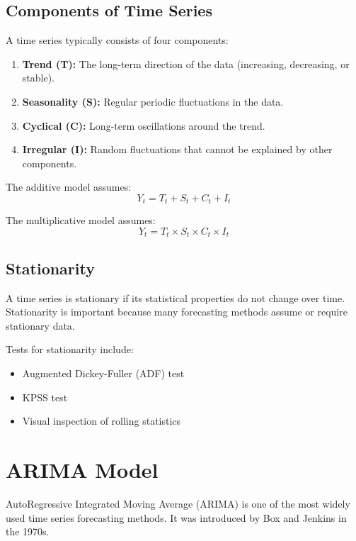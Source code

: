 \documentclass[12pt,a4paper]{report}
\begin{document}
\subsection{Components of Time Series}
\label{subsec:components}
A time series typically consists of four components:

\begin{enumerate}
    \item \textbf{Trend (T):} The long-term direction of the data (increasing, decreasing, or stable).
    \item \textbf{Seasonality (S):} Regular periodic fluctuations in the data.
    \item \textbf{Cyclical (C):} Long-term oscillations around the trend.
    \item \textbf{Irregular (I):} Random fluctuations that cannot be explained by other components.
\end{enumerate}

The additive model assumes:
\begin{equation}
Y_t = T_t + S_t + C_t + I_t
\end{equation}

The multiplicative model assumes:
\begin{equation}
Y_t = T_t \times S_t \times C_t \times I_t
\end{equation}

\subsection{Stationarity}
\label{subsec:stationarity}
A time series is stationary if its statistical properties do not change over time. Stationarity is important because many forecasting methods assume or require stationary data.

Tests for stationarity include:
\begin{itemize}
    \item Augmented Dickey-Fuller (ADF) test
    \item KPSS test
    \item Visual inspection of rolling statistics
\end{itemize}

\section{ARIMA Model}
\label{sec:arima}
AutoRegressive Integrated Moving Average (ARIMA) is one of the most widely used time series forecasting methods. It was introduced by Box and Jenkins in the 1970s.
\end{document}
